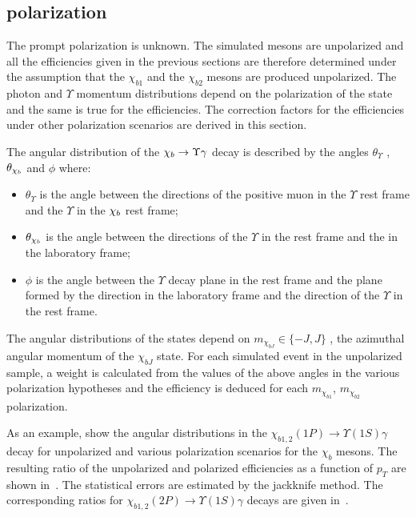 \subsection{\texorpdfstring{\chib}{chib} polarization}
\label{sec:syst:pol}

The prompt \chib polarization is unknown. The simulated \chib mesons are
unpolarized and all the efficiencies given in the previous sections are
therefore determined under the assumption that the $\chi_{b1}$ and the
$\chi_{b2}$ mesons are produced unpolarized. The photon and $\Upsilon$ momentum
distributions depend on the polarization of the \chib state and the same is
true for the efficiencies. The correction factors for the 
efficiencies under other polarization scenarios are derived in this section.

The angular distribution of the $\chi_{b} \rightarrow \Upsilon \gamma$ decay is described
by the angles $\theta_{\Upsilon}$ , $\theta_{\chi_{b}}$ and $\phi$ where:
\begin{itemize}
\item $\theta_{\Upsilon}$ is the angle between the directions of the positive muon in
the $\Upsilon$ rest frame and the $\Upsilon$ in the $\chi_{b}$ rest frame;
\item $\theta_{\chi_{b}}$ is the angle between the directions of the $\Upsilon$ in the
\chib rest frame and the \chib in the laboratory frame; 
\item $\phi$ is the angle
between the $\Upsilon$ decay plane in the \chib rest frame and the plane formed
by the \chib direction in the laboratory frame and the direction of the
$\Upsilon$ in the \chib rest frame. 
\end{itemize} 
The angular distributions of the
\chib states depend on $m_{\chi_{bJ}} \in \{-J, J\}$ , the azimuthal angular
momentum of the $\chi_{bJ}$ state. For each simulated event in
the unpolarized sample, a weight is calculated from the values of the above 
angles in the various polarization hypotheses and the efficiency is
deduced for each $m_{\chi_{b1}}$, $m_{\chi_{b2}}$ polarization. 

As an example,  show the angular
distributions  in the $\chi_{b1,2}(1P)\to\Upsilon(1S)\gamma$
decay for unpolarized and various polarization scenarios for the $\chi_b$ mesons. The
resulting ratio of the unpolarized and polarized efficiencies as a function of $p_T$ are shown
in~. The statistical errors are estimated by the 
jackknife method\cite{jacknife,wouter}. The corresponding ratios for
$\chi_{b1,2}(2P) \to \Upsilon(1S) \gamma$ decays are given in~.


